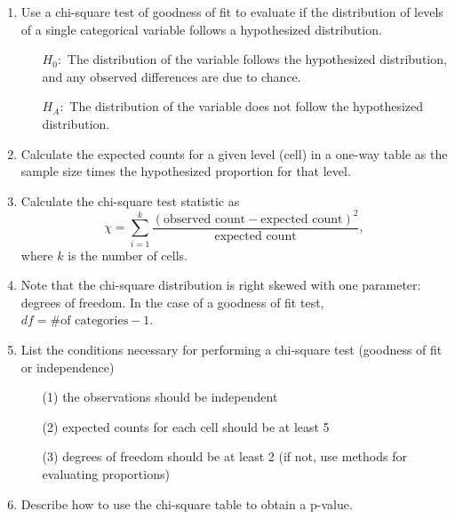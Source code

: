 \documentclass[11pt]{article}
\begin{document}
\begin{enumerate}[resume]
\renewcommand\labelenumi{\textcolor{light}{\textbf{LO \theenumi.}}}

\item Use a chi-square test of goodness of fit to evaluate if the distribution of levels of a single categorical variable follows a hypothesized distribution.
\begin{itemize}
\item[] $H_0:$ The distribution of the variable follows the hypothesized distribution, and any observed differences are due to chance.
\item[] $H_A:$ The distribution of the variable does not follow the hypothesized distribution.
\end{itemize}

\item Calculate the expected counts for a given level (cell) in a one-way table as the sample size times the hypothesized proportion for that level.

\item Calculate the chi-square test statistic as 
\[ \chi = \sum_{i = 1}^{k}  \frac{(\text{observed count} - \text{expected count})^2}{\text{expected count}}, \]
where $k$ is the number of cells.

\item Note that the chi-square distribution is right skewed with one parameter: degrees of freedom. In the case of a goodness of fit test, $df = \# \text{of categories} - 1$.

\item List the conditions necessary for performing a chi-square test (goodness of fit or independence)
\begin{enumerate}
\item[(1)] the observations should be independent
\item[(2)] expected counts for each cell should be at least 5
\item[(3)] degrees of freedom should be at least 2 (if not, use methods for evaluating proportions)
\end{enumerate}

\item Describe how to use the chi-square table to obtain a p-value.

\end{enumerate}
\end{document}
